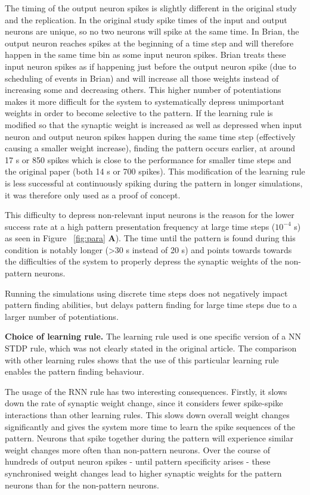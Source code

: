 \documentclass[10pt,a4paper,onecolumn]{article}
\begin{document}
The timing of the output neuron spikes is slightly different in the
original study and the replication. In the original study spike times of
the input and output neurons are unique, so no two neurons will spike at
the same time. In Brian, the output neuron reaches spikes at the
beginning of a time step and will therefore happen in the same time bin
as some input neuron spikes. Brian treats these input neuron spikes as
if happening just before the output neuron spike (due to scheduling of
events in Brian) and will increase all those weights instead of
increasing some and decreasing others. This higher number of
potentiations makes it more difficult for the system to systematically
depress unimportant weights in order to become selective to the pattern.
If the learning rule is modified so that the synaptic weight is
increased as well as depressed when input neuron and output neuron
spikes happen during the same time step (effectively causing a smaller
weight increase), finding the pattern occurs earlier, at around 17 s or
850 spikes which is close to the performance for smaller time steps and
the original paper (both 14 s or 700 spikes). This modification of the
learning rule is less successful at continuously spiking during the
pattern in longer simulations, it was therefore only used as a proof of
concept.

This difficulty to depress non-relevant input neurons is the reason for
the lower success rate at a high pattern presentation frequency at large
time steps (\(10^{-4}\) s) as seen in Figure ~\ref{fig:para}
\textbf{A}). The time until the pattern is found during this condition
is notably longer (\textgreater{}30 s instead of 20 s) and points
towards towards the difficulties of the system to properly depress the
synaptic weights of the non-pattern neurons.

Running the simulations using discrete time steps does not negatively
impact pattern finding abilities, but delays pattern finding for large
time steps due to a larger number of potentiations.

\textbf{Choice of learning rule.} The learning rule used is one specific
version of a NN STDP rule, which was not clearly stated in the original
article. The comparison with other learning rules shows that the use of
this particular learning rule enables the pattern finding behaviour.

The usage of the RNN rule has two interesting consequences. Firstly, it
slows down the rate of synaptic weight change, since it considers fewer
spike-spike interactions than other learning rules. This slows down
overall weight changes significantly and gives the system more time to
learn the spike sequences of the pattern. Neurons that spike together
during the pattern will experience similar weight changes more often
than non-pattern neurons. Over the course of hundreds of output neuron
spikes - until pattern specificity arises - these synchronised weight
changes lead to higher synaptic weights for the pattern neurons than for
the non-pattern neurons.
\end{document}
